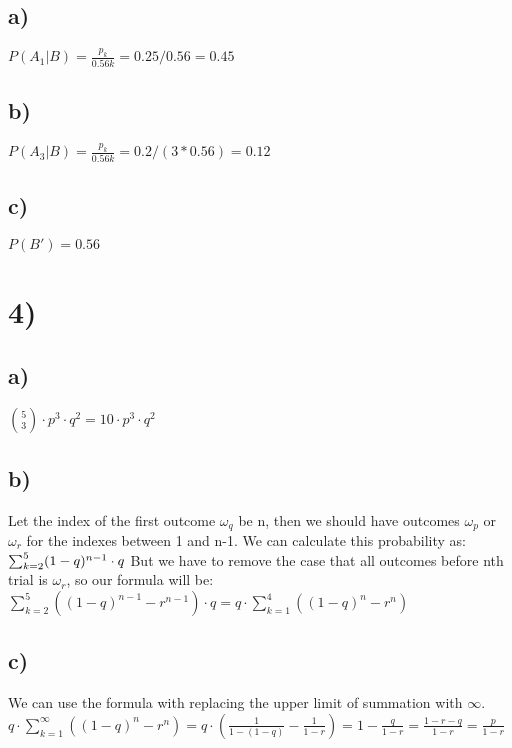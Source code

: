 \documentclass{article}
\begin{document}
    \subsection*{a)}
    \begin{math}
        P(A_1|B) = \frac{p_k}{0.56k} = 0.25/0.56 = 0.45
    \end{math}
    \subsection*{b)}
    \begin{math}
        P(A_3|B) = \frac{p_k}{0.56k} = 0.2/(3*0.56) = 0.12
    \end{math}
    \subsection*{c)}
    \(P(B') = 0.56\)
    \section*{4)}
    \subsection*{a)}
    \begin{math}
        {5 \choose 3} \cdot p^3 \cdot q^2 = 10\cdot p^3 \cdot q^2  
    \end{math}
    \subsection*{b)}
    Let the index of the first outcome \(\omega _q\) be n, 
    then we should have outcomes \(\omega _p\) or \(\omega _r\)
    for the indexes between 1 and n-1. We can calculate this probability as:\\
    \begin{math}
        \sum_{k=2}^{5} (1-q)^{n-1}\cdot q\\
    \end{math}
    But we have to remove the case that all outcomes before nth trial is \(\omega _r\), 
    so our formula will be:\\
    \begin{math}
        \sum_{k=2}^{5} ((1-q)^{n-1} - r^{n-1})\cdot q =
        q\cdot \sum_{k=1}^{4} ((1-q)^n - r^n)
    \end{math}
    \subsection*{c)}
    We can use the formula with replacing the upper limit
    of summation with \({\infty}\).\\
    \begin{math}
        q\cdot \sum_{k=1}^{\infty} ((1-q)^n - r^n) = q\cdot (\frac{1}{1-(1-q)} - \frac{1}{1-r})
        = 1 - \frac{q}{1-r} = \frac{1 - r - q}{1 - r} = \frac{p}{1 - r}
    \end{math}
    
\end{document}
